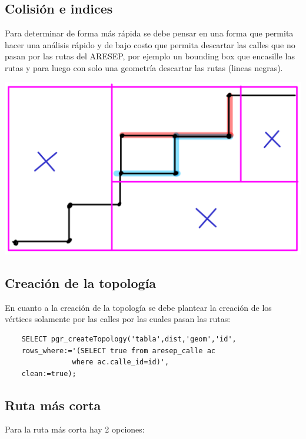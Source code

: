 \break
\subsection{Colisión e indices}

Para determinar de forma más rápida se debe pensar en una forma que permita hacer una análisis rápido y de bajo costo que permita descartar las calles que no pasan por las rutas del ARESEP, por ejemplo un bounding box que encasille las rutas y para luego con solo una geometría descartar las rutas (lineas negras).

\begin{center}
	\includegraphics[scale=.4]{imagenes/colisiones.png}	
\end{center}

\subsection{Creación de la topología}
En cuanto a la creación de la topología se debe plantear la creación de los vértices solamente por las calles por las cuales pasan las rutas:

\begin{lstlisting}
	SELECT pgr_createTopology('tabla',dist,'geom','id',
	rows_where:='(SELECT true from aresep_calle ac
				where ac.calle_id=id)',
	clean:=true);
\end{lstlisting}

\subsection{Ruta más corta}
Para la ruta más corta hay 2 opciones:

